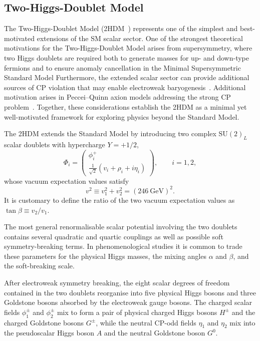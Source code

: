 \subsection{Two-Higgs-Doublet Model}\label{subsec:2HDM}

The Two-Higgs-Doublet Model (2HDM~\cite{Branco:2011iw}) represents one of the simplest and
best-motivated extensions of the SM scalar sector.
One of the strongest theoretical motivations for the Two-Higgs-Doublet
Model arises from supersymmetry, where two Higgs doublets are required
both to generate masses for up- and down-type fermions and to ensure
anomaly cancellation in the Minimal Supersymmetric Standard Model
Furthermore, the extended scalar sector can provide additional
sources of CP violation that may enable electroweak baryogenesis~\cite{Branco:2011iw}.
Additional motivation arises in Peccei--Quinn axion models addressing
the strong CP problem~\cite{Peccei:1977hh,Peccei:1977ur}.
Together, these considerations establish the 2HDM as a minimal yet
well-motivated framework for exploring physics beyond the Standard Model.

The 2HDM extends the Standard Model by introducing two complex
$\mathrm{SU}(2)_L$ scalar doublets with hypercharge $Y=+1/2$,
\[
\Phi_i =
\begin{pmatrix}
\phi_i^+ \\
\frac{1}{\sqrt{2}}(v_i + \rho_i + i \eta_i)
\end{pmatrix},
\qquad i = 1,2,
\]
whose vacuum expectation values satisfy
\[
v^2 \equiv v_1^2 + v_2^2 = (246~\mathrm{GeV})^2 .
\]
It is customary to define the ratio of the two vacuum expectation values as
$\tan\beta \equiv v_2 / v_1$.

The most general renormalisable scalar potential involving the two
doublets contains several quadratic and quartic couplings as well as
possible soft symmetry-breaking terms.
In phenomenological studies it is common to trade these parameters for
the physical Higgs masses, the mixing angles $\alpha$ and $\beta$,
and the soft-breaking scale.

After electroweak symmetry breaking, the eight scalar degrees of
freedom contained in the two doublets reorganise into five physical
Higgs bosons and three Goldstone bosons absorbed by the electroweak
gauge bosons.
The charged scalar fields $\phi_1^\pm$ and $\phi_2^\pm$ mix to form a
pair of physical charged Higgs bosons $H^\pm$ and the charged
Goldstone bosons $G^\pm$, while the neutral CP-odd fields $\eta_1$
and $\eta_2$ mix into the pseudoscalar Higgs boson $A$ and the
neutral Goldstone boson $G^0$.

